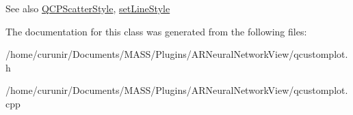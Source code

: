 \begin{DoxySeeAlso}{See also}
\hyperlink{class_q_c_p_scatter_style}{Q\+C\+P\+Scatter\+Style}, \hyperlink{class_q_c_p_graph_a513fecccff5b2a50ce53f665338c60ff}{set\+Line\+Style} 
\end{DoxySeeAlso}


The documentation for this class was generated from the following files\+:\begin{DoxyCompactItemize}
\item 
/home/curunir/\+Documents/\+M\+A\+S\+S/\+Plugins/\+A\+R\+Neural\+Network\+View/qcustomplot.\+h\item 
/home/curunir/\+Documents/\+M\+A\+S\+S/\+Plugins/\+A\+R\+Neural\+Network\+View/qcustomplot.\+cpp\end{DoxyCompactItemize}
